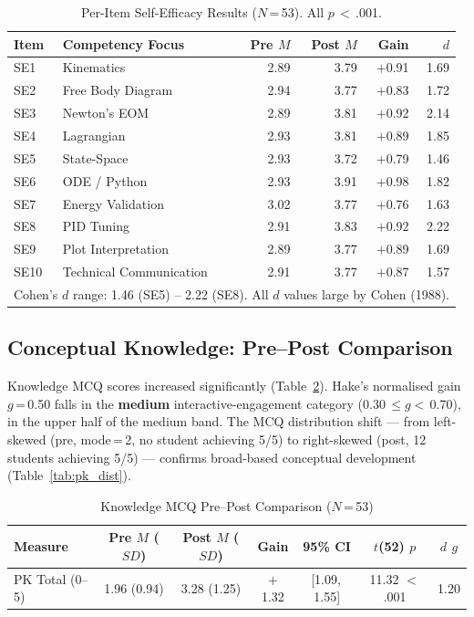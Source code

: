 \documentclass[12pt, a4paper]{article}
\begin{document}
\begin{table}[ht]
\centering
\caption{Per-Item Self-Efficacy Results ($N$\,=\,53). All $p$\,$<$\,.001.}
\label{tab:se_items}
\begin{tabular}{llrrrr}
\toprule
\textbf{Item} & \textbf{Competency Focus} &
\textbf{Pre $M$} & \textbf{Post $M$} & \textbf{Gain} & \textbf{$d$} \\
\midrule
SE1  & Kinematics              & 2.89 & 3.79 & $+$0.91 & 1.69 \\
SE2  & Free Body Diagram       & 2.94 & 3.77 & $+$0.83 & 1.72 \\
SE3  & Newton's EOM            & 2.89 & 3.81 & $+$0.92 & 2.14 \\
SE4  & Lagrangian              & 2.93 & 3.81 & $+$0.89 & 1.85 \\
SE5  & State-Space             & 2.93 & 3.72 & $+$0.79 & 1.46 \\
SE6  & ODE / Python            & 2.93 & 3.91 & $+$0.98 & 1.82 \\
SE7  & Energy Validation       & 3.02 & 3.77 & $+$0.76 & 1.63 \\
SE8  & PID Tuning              & 2.91 & 3.83 & $+$0.92 & 2.22 \\
SE9  & Plot Interpretation     & 2.89 & 3.77 & $+$0.89 & 1.69 \\
SE10 & Technical Communication & 2.91 & 3.77 & $+$0.87 & 1.57 \\
\bottomrule
\multicolumn{6}{l}{\footnotesize Cohen's $d$ range: 1.46 (SE5)
-- 2.22 (SE8). All $d$ values large by Cohen (1988).}
\end{tabular}
\end{table}

\subsection{Conceptual Knowledge: Pre--Post Comparison}

Knowledge MCQ scores increased significantly (Table~\ref{tab:pk}).
Hake's normalised gain $g$\,=\,0.50 falls in the \textbf{medium}
interactive-engagement category \citep{hake1998interactive}
(0.30\,$\leq g <$\,0.70), in the upper half of the medium band.
The MCQ distribution shift --- from left-skewed (pre, mode\,=\,2,
no student achieving 5/5) to right-skewed (post, 12 students
achieving 5/5) --- confirms broad-based conceptual development
(Table~\ref{tab:pk_dist}).

\begin{table}[ht]
\centering
\caption{Knowledge MCQ Pre--Post Comparison ($N$\,=\,53)}
\label{tab:pk}
\begin{tabular}{lcccccc}
\toprule
\textbf{Measure} & \textbf{Pre $M$ ($SD$)} & \textbf{Post $M$ ($SD$)} &
\textbf{Gain} & \textbf{95\% CI} &
\textbf{$t$(52) \quad $p$} & \textbf{$d$ \quad $g$} \\
\midrule
PK Total (0--5) & 1.96 (0.94) & 3.28 (1.25) & $+$1.32 &
[1.09,\,1.55] & 11.32 \quad $<$.001 & 1.20 \quad 0.50 \\
\bottomrule
\end{tabular}
\end{table}
\end{document}
